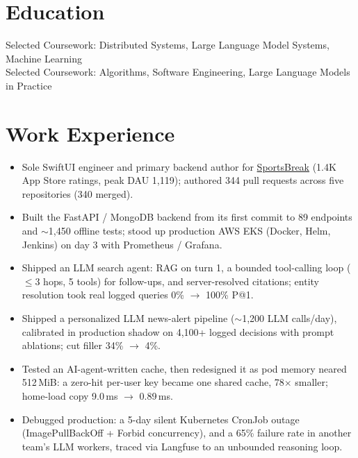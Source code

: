 \documentclass[11pt, letterpaper]{article}
\begin{document}

\section{Education}
Selected Coursework: Distributed Systems, Large Language Model Systems, Machine Learning\\[1pt]
Selected Coursework: Algorithms, Software Engineering, Large Language Models in Practice

\section{Work Experience}
\begin{itemize}
  \item Sole SwiftUI engineer and primary backend author for \href{https://apps.apple.com/app/id6762649287}{SportsBreak} (1.4K App Store ratings, peak DAU 1{,}119); authored 344 pull requests across five repositories (340 merged).
  \item Built the FastAPI / MongoDB backend from its first commit to 89 endpoints and $\sim$1{,}450 offline tests; stood up production AWS EKS (Docker, Helm, Jenkins) on day 3 with Prometheus / Grafana.
  \item Shipped an LLM search agent: RAG on turn 1, a bounded tool-calling loop ($\le$3 hops, 5 tools) for follow-ups, and server-resolved citations; entity resolution took real logged queries 0\% $\to$ 100\% P@1.
  \item Shipped a personalized LLM news-alert pipeline ($\sim$1{,}200 LLM calls/day), calibrated in production shadow on 4{,}100+ logged decisions with prompt ablations; cut filler 34\% $\to$ 4\%.
  \item Tested an AI-agent-written cache, then redesigned it as pod memory neared 512\,MiB: a zero-hit per-user key became one shared cache, 78$\times$ smaller; home-load copy 9.0\,ms $\to$ 0.89\,ms.
  \item Debugged production: a 5-day silent Kubernetes CronJob outage (ImagePullBackOff + Forbid concurrency), and a 65\% failure rate in another team's LLM workers, traced via Langfuse to an unbounded reasoning loop.
\end{itemize}
\end{document}
